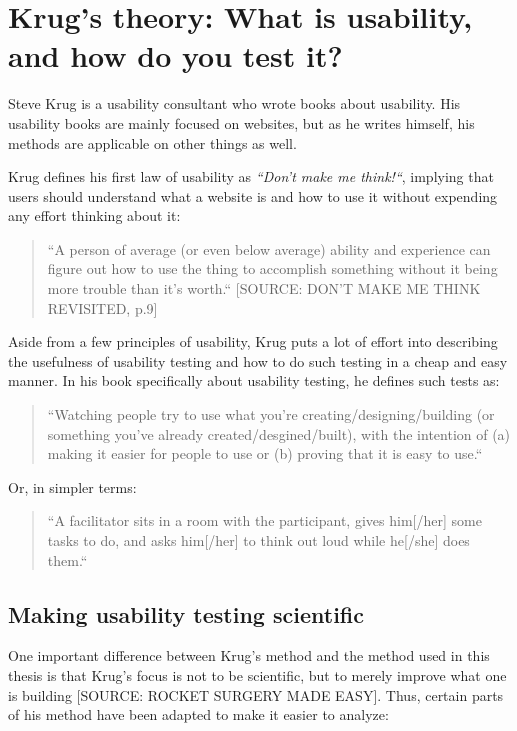 \section{Krug's theory: What is usability, and how do you test it?}

Steve Krug is a usability consultant who wrote books about usability. His usability books are mainly focused on websites, but as he writes himself, his methods are applicable on other things as well.

Krug defines his first law of usability as \textit{“Don't make me think!“}, implying that users should understand what a website is and how to use it without expending any effort thinking about it:

\begin{quote}
“A person of average (or even below average) ability and experience can figure out how to use the thing to accomplish something without it being more trouble than it's worth.“ [SOURCE: DON'T MAKE ME THINK REVISITED, p.9]
\end{quote}

Aside from a few principles of usability, Krug puts a lot of effort into describing the usefulness of usability testing and how to do such testing in a cheap and easy manner. In his book specifically about usability testing, he defines such tests as:

\begin{quote}
“Watching people try to use what you're creating/designing/building (or something you've already created/desgined/built), with the intention of (a) making it easier for people to use or (b) proving that it is easy to use.“
\end{quote}

Or, in simpler terms:

\begin{quote}
“A facilitator sits in a room with the participant, gives him[/her] some tasks to do, and asks him[/her] to think out loud while he[/she] does them.“
\end{quote}

\subsection{Making usability testing scientific}

One important difference between Krug's method and the method used in this thesis is that Krug's focus is not to be scientific, but to merely improve what one is building [SOURCE: ROCKET SURGERY MADE EASY]. Thus, certain parts of his method have been adapted to make it easier to analyze:

